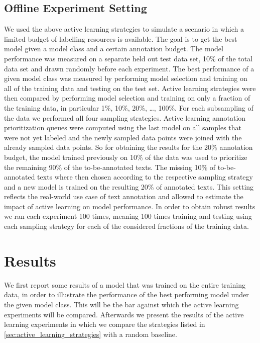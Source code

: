 \documentclass[runningheads,a4paper]{article}
\begin{document}
\subsection{Offline Experiment Setting}
We used the above active learning strategies to simulate a scenario in which a limited budget of labelling resources is available. The goal is to get the best model given a model class and a certain annotation budget. The model performance was measured on a separate held out test data set, 10\% of the total data set and drawn randomly before each experiment. The best performance of a given model class was measured by performing model selection and training on all of the training data and testing on the test set. Active learning strategies were then compared by performing model selection and training on only a fraction of the training data, in particular 1\%, 10\%, 20\%, \dots, 100\%. For each subsampling of the data we performed all four sampling strategies. Active learning annotation prioritization queues were computed using the last model on all samples that were not yet labeled and the newly sampled data points were joined with the already sampled data points. So for obtaining the results for the 20\% annotation budget, the model trained previously on 10\% of the data was used to prioritize the remaining 90\% of the to-be-annotated texts. The missing 10\% of to-be-annotated texts where then chosen according to the respective sampling strategy and a new model is trained on the resulting 20\% of annotated texts. This setting reflects the real-world use case of text annotation and allowed to estimate the impact of active learning on model performance. In order to obtain robust results we ran each experiment 100 times, meaning 100 times training and testing using each sampling strategy for each of the considered fractions of the training data.

\section{Results}\label{sec:results}

We first report some results of a model that was trained on the entire training data, in order to illustrate the performance of the best performing model under the given model class. This will be the bar against which the active learning experiments will be compared. Afterwards we present the results of the active learning experiments in which we compare the strategies listed in \autoref{sec:active_learning_strategies} with a random baseline. 
\end{document}
